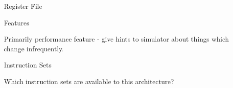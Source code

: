 \begin{frame}{Register File}

\centering
{}


\end{frame}

\begin{frame}{Features}

Primarily performance feature - give hints to simulator about things 
which change infrequently.

\end{frame}

\begin{frame}{Instruction Sets}

Which instruction sets are available to this architecture?

\end{frame}
